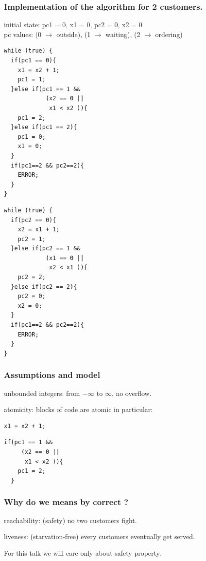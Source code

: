 \documentclass{beamer}
\begin{document}
\begin{frame}[fragile]
  \frametitle{Implementation of the algorithm for 2 customers.}
\begin{center}
{\footnotesize
initial state: pc1 = 0, x1 = 0, pc2 = 0, x2 = 0\\
pc values: (0 $\rightarrow$ outside), (1 $\rightarrow$ waiting), (2 $\rightarrow$ ordering)
}
\end{center}
\begin{minipage}{0.45\linewidth}
\begin{lstlisting}
while (true) {
  if(pc1 == 0){
    x1 = x2 + 1;
    pc1 = 1;
  }else if(pc1 == 1 &&
            (x2 == 0 ||
             x1 < x2 )){
    pc1 = 2;
  }else if(pc1 == 2){
    pc1 = 0;
    x1 = 0;
  }
  if(pc1==2 && pc2==2){
    ERROR;
  }
}
\end{lstlisting}
\end{minipage}
\hfill
\begin{minipage}{0.45\linewidth}
\begin{lstlisting}
while (true) {
  if(pc2 == 0){
    x2 = x1 + 1;
    pc2 = 1;
  }else if(pc2 == 1 &&
            (x1 == 0 ||
             x2 < x1 )){
    pc2 = 2;
  }else if(pc2 == 2){
    pc2 = 0;
    x2 = 0;
  }
  if(pc1==2 && pc2==2){
    ERROR;
  }
}
\end{lstlisting}
\end{minipage}
\end{frame}

\begin{frame}[fragile]
  \frametitle{Assumptions and model}
  unbounded integers: from $-\infty$ to $\infty$, no overflow.

  \vspace{10pt}

  atomicity: blocks of code are atomic in particular:
\begin{lstlisting}[numbers=none]
  x1 = x2 + 1;
\end{lstlisting}
\begin{lstlisting}[numbers=none]
  if(pc1 == 1 &&
     (x2 == 0 ||
      x1 < x2 )){
    pc1 = 2;
  }
\end{lstlisting}
\end{frame}

\begin{frame}
  \frametitle{Why do we means by correct ?}
  reachability: (safety) no two customers fight.
  
  \vspace{5mm}

  liveness: (starvation-free) every customers eventually get served.

  \vspace{1cm}

  For this talk we will care only about \alert{safety} property.

\end{frame}
\end{document}
